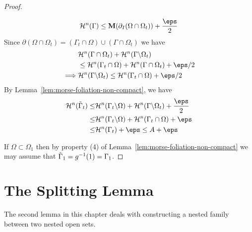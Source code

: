 \begin{lemma}
\begin{proof}
\begin{itemize}
\begin{equation*}
                \mathcal{H}^n(\Gamma) \leq \mathbf{M}(\partial_I(\Omega\cap\Omega_t)) + \frac{\eps}{2}
            \end{equation*}
            Since $\partial(\Omega\cap \Omega_t) = (\Gamma_t\cap\Omega)\cup(\Gamma\cap\Omega_t)$ we have
            \begin{equation*}
                \begin{split}
                    &\mathcal{H}^n(\Gamma\cap\Omega_t) + \mathcal{H}^n(\Gamma\backslash\Omega_t) \\
                    &\leq \mathcal{H}^n(\Gamma_t\cap\Omega) + \mathcal{H}^n(\Gamma\cap\Omega_t) + \eps/2\\
                    \implies & \mathcal{H}^n(\Gamma\backslash\Omega_t) \leq \mathcal{H}^n(\Gamma_t\cap\Omega) + \eps/2
                \end{split}
            \end{equation*}
            By Lemma~\ref{lem:morse-foliation-non-compact}, we have
        \begin{equation*}
            \begin{split}
                \mathcal{H}^n(\Tilde{\Gamma}_t) \leq& \mathcal{H}^n(\Gamma_t\backslash \Omega) + \mathcal{H}^n(\Gamma\backslash\Omega_t) + \frac{\eps}{2}\\
                \leq& \mathcal{H}^n(\Gamma_t\backslash \Omega) + \mathcal{H}^n(\Gamma_t\cap\Omega) + \eps\\
                \leq& \mathcal{H}^n(\Gamma_t) + \eps \leq A + \eps
            \end{split}
        \end{equation*}
        \end{itemize}
        If $\Omega \subset \Omega_1$ then by property (4) of Lemma~\ref{lem:morse-foliation-non-compact} we may assume that $\Tilde{\Gamma}_1 = g^{-1}(1) = \Gamma_1$.
    \end{proof}
\end{lemma}

\section{The Splitting Lemma}\label{sec:splitting-lemma}

The second lemma in this chapter deals with constructing a nested family between two nested open sets.

